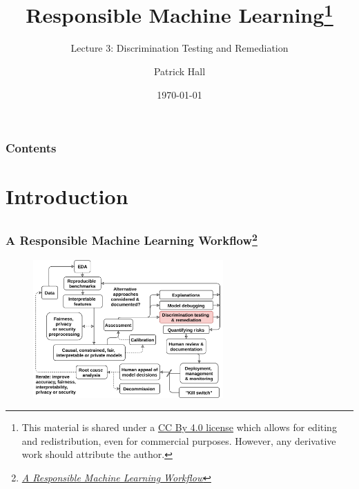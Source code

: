\documentclass[11pt,aspectratio=169,hyperref={colorlinks}]{beamer}
\author{Patrick Hall}
\title{Responsible Machine Learning\footnote{\tiny{This material is shared under a \href{https://creativecommons.org/licenses/by/4.0/deed.ast}{CC By 4.0 license} which allows for editing and redistribution, even for commercial purposes. However, any derivative work should attribute the author.}}}
\subtitle{Lecture 3: Discrimination Testing and Remediation}
\institute{The George Washington University}
\date{\today}
\begin{document}
	
	\maketitle
	
	\begin{frame}
	
		\frametitle{Contents}
		
		\tableofcontents{}
		
	\end{frame}


	\section{Introduction}

		\subsection*{}

		\begin{frame}
		
			\frametitle{A Responsible Machine Learning Workflow\footnote{\href{https://www.mdpi.com/2078-2489/11/3/137/htm}{\textit{A Responsible Machine Learning Workflow}}}}
			
			\begin{figure}[htb]
				\begin{center}
					\includegraphics[height=150pt]{../img/rml_diagram_lec3_hilite.png}
					\label{fig:blueprint}
				\end{center}
			\end{figure}		
					
		\end{frame}	
\end{document}
